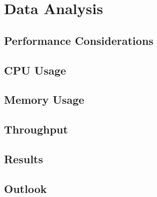 %
%

\pagebreak
\section{Data Analysis}

\onehalfspacing

\subsection{Performance Considerations}

\subsection{CPU Usage}

\subsection{Memory Usage}

\subsection{Throughput}

\subsection{Results}

\subsection{Outlook}
